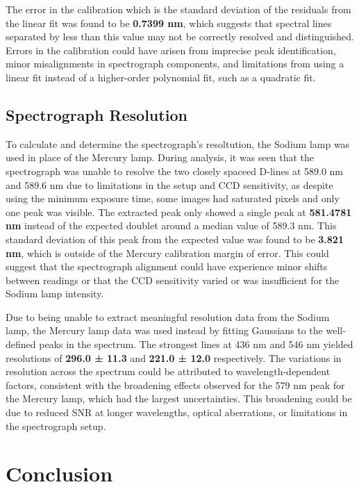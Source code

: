 \documentclass[11pt, a4paper, twocolumn]{article}
\begin{document}
The error in the calibration which is the standard deviation of the residuals from the linear fit was found to be \textbf{0.7399 nm},
which suggests that spectral lines separated by less than this value may not be correctly resolved and distinguished. Errors in the
calibration could have arisen from imprecise peak identification, minor misalignments in spectrograph components, and limitations 
from using a linear fit instead of a higher-order polynomial fit, such as a quadratic fit.

\subsection{Spectrograph Resolution}

To calculate and determine the spectrograph's resoltution, the Sodium lamp was used in place of the Mercury lamp. During analysis, it
was seen that the spectrograph was unable to resolve the two closely spaceed D-lines at 589.0 nm and 589.6 nm due to limitations in
the setup and CCD sensitivity, as despite using the minimum exposure time, some images had saturated pixels and only one peak was
visible. The extracted peak only showed a single peak at \textbf{581.4781 nm} instead of the expected doublet around a median value
of 589.3 nm. This standard deviation of this peak from the expected value was found to be \textbf{3.821 nm}, which is outside of the
Mercury calibration margin of error. This could suggest that the spectrograph alignment could have experience minor shifts between
readings or that the CCD sensitivity varied or was insufficient for the Sodium lamp intensity.

Due to being unable to extract meaningful resolution data from the Sodium lamp, the Mercury lamp data was used instead by fitting
Gaussians to the well-defined peaks in the spectrum. The strongest lines at 436 nm and 546 nm yielded resolutions of 
\textbf{296.0 ± 11.3} and \textbf{221.0 ± 12.0} respectively. The variations in resolution across the spectrum could be attributed
to wavelength-dependent factors, consistent with the broadening effects observed for the 579 nm peak for the Mercury lamp, which
had the largest uncertainties. This broadening could be due to reduced SNR at longer wavelengths, optical aberrations, or limitations
in the spectrograph setup.

\section{Conclusion}
\end{document}
